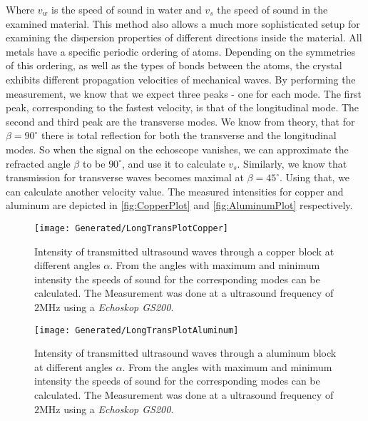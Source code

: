 \documentclass[a4paper,10pt,twocolumn]{article}
\begin{document}
    Where $v_w$ is the speed of sound in water and $v_s$ the speed of sound in the examined material.
    This method also allows a much more sophisticated setup for examining the dispersion properties of different directions inside the material.
    All metals have a specific periodic ordering of atoms.
    Depending on the symmetries of this ordering, as well as the types of bonds between the atoms, the crystal exhibits different propagation velocities of mechanical waves.
    By performing the measurement, we know that we expect three peaks - one for each mode.
    The first peak, corresponding to the fastest velocity, is that of the longitudinal mode.
    The second and third peak are the transverse modes.
    We know from theory, that for $\beta = 90^\circ$ there is total reflection for both the transverse and the longitudinal modes.
    So when the signal on the echoscope vanishes, we can approximate the refracted angle $\beta$ to be $90^\circ $, and use it to calculate $v_s$.
    Similarly, we know that transmission for transverse waves becomes maximal at $\beta = 45^\circ $.
    Using that, we can calculate another velocity value.
    The measured intensities for copper and aluminum are depicted in \autoref{fig:CopperPlot} and \autoref{fig:AluminumPlot} respectively.
    \begin{figure}
        \begin{center}
            \texttt{[image: Generated/LongTransPlotCopper]}
            \caption[]{Intensity of transmitted ultrasound waves through a copper block at different angles $\alpha$.
            From the angles with maximum and minimum intensity the speeds of sound for the corresponding modes can be calculated.
            The Measurement was done at a ultrasound frequency of $2$MHz using a \textit{Echoskop GS200}.}
            \label{fig:CopperPlot}
        \end{center}
    \end{figure}
    \begin{figure}
        \begin{center}
            \texttt{[image: Generated/LongTransPlotAluminum]}
            \caption[]{Intensity of transmitted ultrasound waves through a aluminum block at different angles $\alpha$.
            From the angles with maximum and minimum intensity the speeds of sound for the corresponding modes can be calculated.
            The Measurement was done at a ultrasound frequency of $2$MHz using a \textit{Echoskop GS200}.}
            \label{fig:AluminumPlot}
        \end{center}
    \end{figure}
\end{document}
